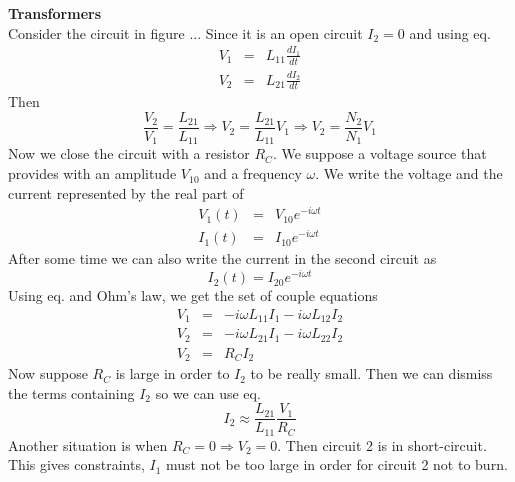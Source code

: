\documentclass[12pt,a4paper]{article}
\newcommand{\dt}[1]{\frac{d #1}{dt}} %
\begin{document}
\textbf{Transformers}\\
Consider the circuit in figure ... Since it is an open circuit $I_2 = 0$ and using eq.  
\begin{eqnarray}
	V_1 & = & L_{11}\dt{I_1} \\
	V_2 & = & L_{21}\dt{I_2}
\end{eqnarray}
Then
\begin{equation}
	\frac{V_2}{V_1} = \frac{L_{21}}{L_{11}} \Rightarrow V_2 = \frac{L_{21}}{L_{11}} V_1 \Rightarrow V_2 = \frac{N_{2}}{N_{1}} V_1
\end{equation}
Now we close the circuit with a resistor $R_C$. We suppose a voltage source that provides with an amplitude $V_{10}$ and a frequency $\omega$. We write the voltage and the current represented by the real part of
\begin{eqnarray}
	V_1(t) & = & V_{10}e^{-i\omega t} \\
	I_1(t) & = & I_{10}e^{-i\omega t}
\end{eqnarray}
After some time we can also write the current in the second circuit as
\begin{equation}
	I_2(t)  =  I_{20}e^{-i\omega t}
\end{equation}
Using eq. and Ohm's law, we get the set of couple equations
\begin{eqnarray}
	V_1 & = & -i\omega L_{11}I_1 -i\omega L_{12}I_2 \\
	V_2 & = & -i\omega L_{21}I_1 -i\omega L_{22}I_2 \\
	V_2 & = & R_C I_2 
\end{eqnarray}
Now suppose $R_C$ is large in order to $I_2$ to be really small. Then we can dismiss the terms containing $I_2$ so we can use eq.
\begin{equation}
	I_2 \approx \frac{L_{21}}{L_{11}} \frac{V_1}{R_C}
\end{equation}
Another situation is when $R_C = 0 \Rightarrow V_2 = 0$. Then circuit 2 is in short-circuit. This gives constraints, $I_1$ must not be too large in order for  circuit 2 not to burn. 
\end{document}
